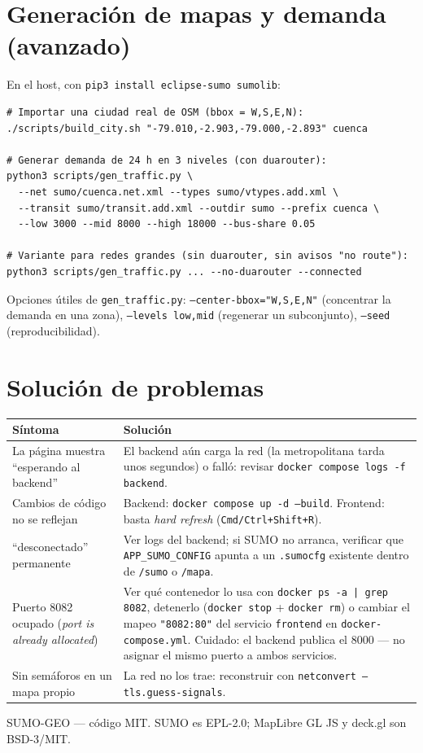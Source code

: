 \documentclass[11pt,a4paper]{article}
\begin{document}
\section{Generación de mapas y demanda (avanzado)}

En el host, con \texttt{pip3 install eclipse-sumo sumolib}:

\begin{lstlisting}
# Importar una ciudad real de OSM (bbox = W,S,E,N):
./scripts/build_city.sh "-79.010,-2.903,-79.000,-2.893" cuenca

# Generar demanda de 24 h en 3 niveles (con duarouter):
python3 scripts/gen_traffic.py \
  --net sumo/cuenca.net.xml --types sumo/vtypes.add.xml \
  --transit sumo/transit.add.xml --outdir sumo --prefix cuenca \
  --low 3000 --mid 8000 --high 18000 --bus-share 0.05

# Variante para redes grandes (sin duarouter, sin avisos "no route"):
python3 scripts/gen_traffic.py ... --no-duarouter --connected
\end{lstlisting}

Opciones útiles de \texttt{gen\_traffic.py}: \texttt{--center-bbox="W,S,E,N"}
(concentrar la demanda en una zona), \texttt{--levels low,mid} (regenerar un
subconjunto), \texttt{--seed} (reproducibilidad).

\section{Solución de problemas}

\begin{longtable}{@{}p{6.2cm}p{8.3cm}@{}}
\toprule
\textbf{Síntoma} & \textbf{Solución} \\
\midrule
La página muestra ``esperando al backend'' & El backend aún carga la red (la
  metropolitana tarda unos segundos) o falló: revisar
  \texttt{docker compose logs -f backend}. \\
Cambios de código no se reflejan & Backend: \texttt{docker compose up -d --build}.
  Frontend: basta \emph{hard refresh} (\texttt{Cmd/Ctrl+Shift+R}). \\
``desconectado'' permanente & Ver logs del backend; si SUMO no arranca,
  verificar que \texttt{APP\_SUMO\_CONFIG} apunta a un \texttt{.sumocfg}
  existente dentro de \texttt{/sumo} o \texttt{/mapa}. \\
Puerto 8082 ocupado (\emph{port is already allocated}) & Ver qué contenedor lo usa con
  \texttt{docker ps -a | grep 8082}, detenerlo (\texttt{docker stop} +
  \texttt{docker rm}) o cambiar el mapeo \texttt{"8082:80"} del servicio
  \texttt{frontend} en \texttt{docker-compose.yml}. Cuidado: el backend publica
  el 8000 --- no asignar el mismo puerto a ambos servicios. \\
Sin semáforos en un mapa propio & La red no los trae: reconstruir con
  \texttt{netconvert --tls.guess-signals}. \\
\bottomrule
\end{longtable}

\vfill
\begin{center}
\small SUMO-GEO --- código MIT. SUMO es EPL-2.0; MapLibre GL JS y deck.gl son BSD-3/MIT.
\end{center}
\end{document}
